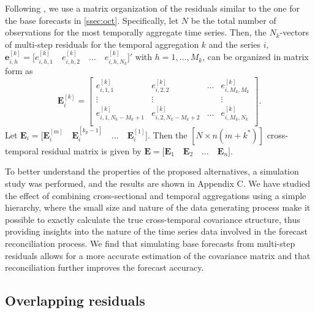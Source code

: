 \documentclass[12pt]{article}
\newcommand{\evet}{\bm{e}}
\newcommand{\Evet}{\bm{E}}
\theoremstyle{definition}
\begin{document}
Following \cite{difonzo2023}, we use a matrix organization of the residuals similar to the one for the base forecasts in \autoref{ssec:oct}. Specifically, let $N$ be the total number of observations for the most temporally aggregate time series. Then, the $N_k$-vectors of multi-step residuals for the temporal aggregation $k$ and the series $i$, $\evet_{i,h}^{[k]} =  \Big[e_{i,h,1}^{[k]} \quad e_{i,h,2}^{[k]} \quad \dots \quad e_{i,h,N_k}^{[k]}\Big]'$ with $h = 1,\dots, M_k$, can be organized in matrix form as
$$
	\Evet_i^{[k]} = \begin{bmatrix}
		e_{i,1,1}^{[k]}                     & e_{i,2,2}^{[k]}                     & \dots & e_{i,M_k,M_k}^{[k]} \\[-0.25cm]
		\vdots                            & \vdots                            &       & \vdots                  \\[-0.25cm]
		e_{i,1,N_k - M_k + 1}^{[k]} & e_{i,2,N_k - M_k + 2}^{[k]} & \dots & e_{i,M_k,N_k}^{[k]}         \\
	\end{bmatrix}.
$$
Let $\Evet_i = \Big[\Evet_i^{[m]} \quad \Evet_i^{[k_p-1]} \quad \dots \quad \Evet_i^{[1]}  \Big]$. Then the $[N \times n(m+k^\ast)]$ cross-temporal residual matrix is given by $
	\Evet = \Big[\Evet_1 \quad \Evet_2 \quad \dots \quad \Evet_n \Big]$.

To better understand the properties of the proposed alternatives, a simulation study was performed, and the results are shown in Appendix C. We have studied the effect of combining cross-sectional and temporal aggregations using a simple hierarchy, where the small size and nature of the data generating process make it possible to exactly calculate the true cross-temporal covariance structure, thus providing insights into the nature of the time series data involved in the forecast reconciliation process. We find that simulating base forecasts from multi-step residuals allows for a more accurate estimation of the covariance matrix and that reconciliation further improves the forecast accuracy. %

\subsection{Overlapping residuals}\label{ssec:over_res}
\end{document}

